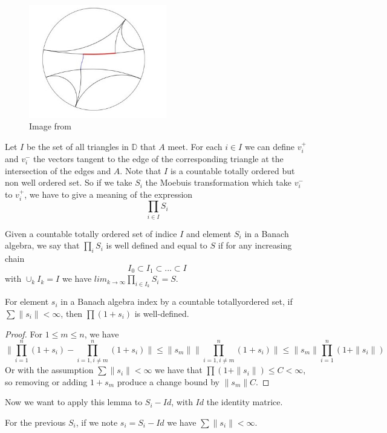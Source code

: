 \begin{figure}[h!]
\centering
\includegraphics[width=6cm]{Image/Shear.jpg}
\caption{Image from \cite{wright2018mirzakhani}}
\end{figure}

Let $I$ be the set of all triangles in $\mathbb{D}$ that $A$ meet. For each $i\in I$ we can define $v_i^+$ and $v_i^-$ the vectors tangent to the edge of the corresponding triangle at the intersection of the edges and $A$. Note that $I$ is a countable totally ordered but non well ordered set. So if we take $S_i$ the Moebuis transformation which take $v_i^-$ to $v_i^+$, we have to give a meaning of the expression \[
\prod_{i\in I}S_i
\]

\begin{dfnt}
Given a countable totally ordered set of indice $I$ and element $S_i$ in a Banach algebra, we say that $\prod_i S_i$ is well defined and equal to $S$ if for any increasing chain \[
I_0 \subset I_1 \subset ... \subset I
\]
with $\cup_k I_k=I$ we have $lim_{k \to \infty} \prod_{i \in I_k}S_i =S $.
\end{dfnt}

\begin{lem}
For element $s_i$ in a Banach algebra index by a countable totallyordered set, if $\sum \| s_i \| < \infty$, then $\prod(1+s_i)$ is well-defined.
\end{lem}
\begin{proof}
For $1 \leq m \leq n$, we have \[
\| \prod_{i=1}^n(1+s_i)-\prod_{i=1,i \neq m}^n (1+s_i) \| \leq \|s_m \| \| \prod_{i=1,i \neq m}^n (1+s_i) \| \leq \|s_m\| \prod_{i=1}^n (1+\|s_i\|)
\]
Or with the assumption $\sum \| s_i \| < \infty$ we have that $\prod(1+\|s_i\|) \leq C < \infty$, so removing or adding $1+s_m$ produce a change bound by $\|s_m\| C$.
\end{proof}

Now we want to apply this lemma to $S_i - Id$, with $Id$ the identity matrice.

\begin{lem}
For the previous $S_i$, if we note $s_i=S_i - Id$ we have $\sum \| s_i \| < \infty$.
\end{lem}

